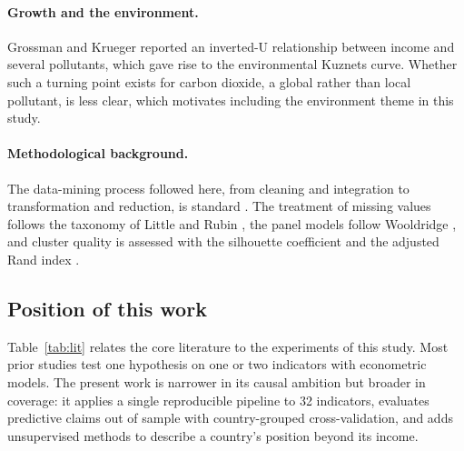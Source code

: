 \documentclass[11pt,a4paper]{article}
\begin{document}
\paragraph{Growth and the environment.} Grossman and Krueger \cite{grossman} reported an inverted-U relationship between income and several pollutants, which gave rise to the environmental Kuznets curve. Whether such a turning point exists for carbon dioxide, a global rather than local pollutant, is less clear, which motivates including the environment theme in this study.

\paragraph{Methodological background.} The data-mining process followed here, from cleaning and integration to transformation and reduction, is standard \cite{han}. The treatment of missing values follows the taxonomy of Little and Rubin \cite{little}, the panel models follow Wooldridge \cite{wooldridge}, and cluster quality is assessed with the silhouette coefficient \cite{rousseeuw} and the adjusted Rand index \cite{hubert}.

\subsection{Position of this work}
Table~\ref{tab:lit} relates the core literature to the experiments of this study. Most prior studies test one hypothesis on one or two indicators with econometric models. The present work is narrower in its causal ambition but broader in coverage: it applies a single reproducible pipeline to 32 indicators, evaluates predictive claims out of sample with country-grouped cross-validation, and adds unsupervised methods to describe a country's position beyond its income.
\end{document}

